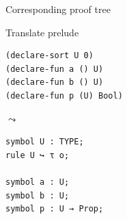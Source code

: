 \documentclass[aspectratio=169,xcolor={dvipsnames}]{beamer}
\begin{document}
\begin{frame}{Corresponding proof tree}
    \begin{figure}
        \centering
    \end{figure}
\end{frame}


\begin{frame}[fragile]{Translate prelude}
\noindent\begin{minipage}{.45\textwidth}
\begin{verbatim}
(declare-sort U 0)
(declare-fun a () U)
(declare-fun b () U)
(declare-fun p (U) Bool)
\end{verbatim}
\end{minipage}
$\leadsto$\hfill \begin{minipage}{.45\textwidth}
\begin{lstlisting}[]
symbol U : TYPE;
rule U ↪ τ o;

symbol a : U;
symbol b : U;
symbol p : U → Prop;
\end{lstlisting}
\end{minipage}
\end{frame}
\end{document}
